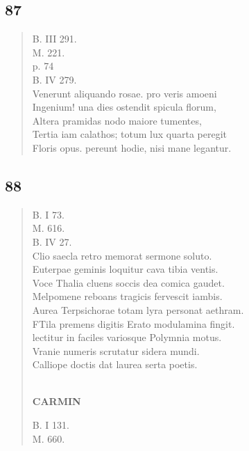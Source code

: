 \documentclass[11pt, a4paper]{report}
\begin{document}
            \subsection*{87}
      \begin{verse}
      B. III 291. \\ M. 221. \\ p. 74 \\ B. IV 279. \\ Venerunt aliquando rosae. pro veris amoeni \\ Ingenium! una dies ostendit spicula florum, \\ Altera pramidas nodo maiore tumentes, \\ Tertia iam calathos; totum lux quarta peregit \\ Floris opus. pereunt hodie, nisi mane legantur. \\ 
      \end{verse}
  
            \subsection*{88}
      \begin{verse}
      B. I 73. \\ M. 616. \\ B. IV 27. \\ Clio saecla retro memorat sermone soluto. \\ Euterpae geminis loquitur cava tibia ventis. \\ Voce Thalia cluens soccis dea comica gaudet. \\ Melpomene reboans tragicis fervescit iambis. \\ Aurea Terpsichorae totam lyra personat aethram. \\ FTila premens digitis Erato modulamina fingit. \\ lectitur in faciles variosque Polymnia motus. \\ Vranie numeris scrutatur sidera mundi. \\ Calliope doctis dat laurea serta poetis. \\ 
        ﻿\pagebreak 
    \begin{center} \textbf{CARMIN} \end{center} \marginpar{[100]} B. I 131. \\ M. 660. \\ 
      \end{verse}
  
\end{document}
